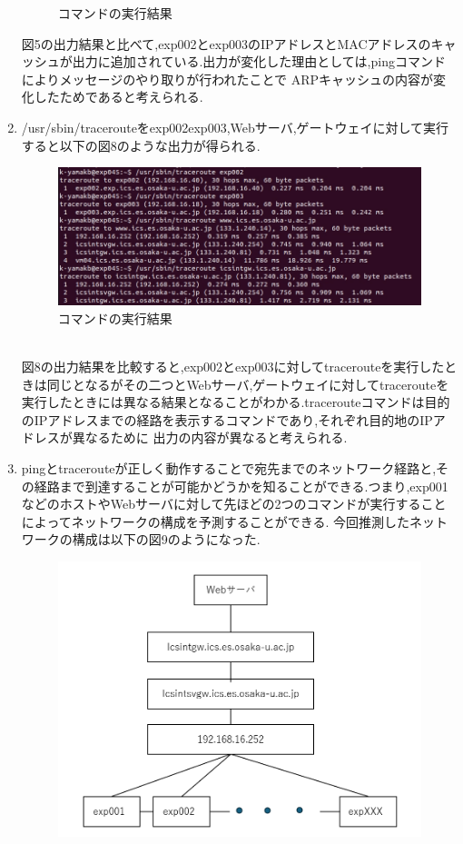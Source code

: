 \documentclass[dvipdfmx]{jarticle}
\begin{document}
\begin{enumerate}
\begin{figure}[h]
        \caption{コマンドの実行結果}
    \end{figure}
    図5の出力結果と比べて,exp002とexp003のIPアドレスとMACアドレスのキャッシュが出力に追加されている.出力が変化した理由としては,pingコマンドによりメッセージのやり取りが行われたことで
    ARPキャッシュの内容が変化したためであると考えられる.
    \item /usr/sbin/tracerouteをexp002exp003,Webサーバ,ゲートウェイに対して実行すると以下の図8のような出力が得られる.
    \begin{figure}[h]
        \centering
        \includegraphics[width=12cm]{1-2-6.png}
        \caption{コマンドの実行結果}
    \end{figure}
    \\図8の出力結果を比較すると,exp002とexp003に対してtracerouteを実行したときは同じとなるがその二つとWebサーバ,ゲートウェイに対してtracerouteを
    実行したときには異なる結果となることがわかる.tracerouteコマンドは目的のIPアドレスまでの経路を表示するコマンドであり,それぞれ目的地のIPアドレスが異なるために
    出力の内容が異なると考えられる.
    \item pingとtracerouteが正しく動作することで宛先までのネットワーク経路と,その経路まで到達することが可能かどうかを知ることができる.つまり,exp001などのホストやWebサーバに対して先ほどの2つのコマンドが実行することによってネットワークの構成を予測することができる.
    今回推測したネットワークの構成は以下の図9のようになった.
    \begin{figure}[h]
        \centering
        \includegraphics[width=12cm]{1-2-7.png}

\end{figure}
\end{enumerate}
\end{document}
